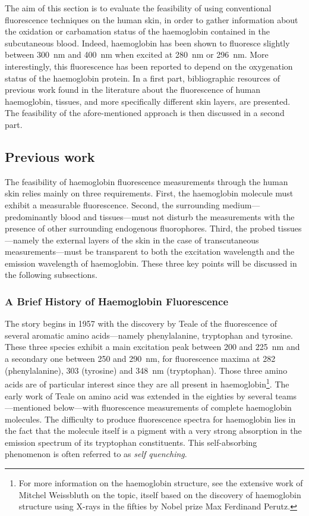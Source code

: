 The aim of this section is to evaluate the feasibility of using conventional fluorescence techniques on the human skin, in order to gather information about the oxidation or carbamation status of the haemoglobin contained in the subcutaneous blood. Indeed, haemoglobin has been shown to fluoresce slightly between 300~nm and 400~nm when excited at 280~nm or 296~nm. More interestingly, this fluorescence has been reported to depend on the oxygenation status of the haemoglobin protein\cite{itoh1981, hirsch2003}. In a first part, bibliographic resources of previous work found in the literature about the fluorescence of human haemoglobin, tissues, and more specifically different skin layers, are presented. The feasibility of the afore-mentioned approach is then discussed in a second part.

\subsection{Previous work}\label{sect:co2hb:fluo:prev_work}

The feasibility of haemoglobin fluorescence measurements through the human skin relies mainly on three requirements. First, the haemoglobin molecule must exhibit a measurable fluorescence. Second, the surrounding medium---predominantly blood and tissues---must not disturb the measurements with the presence of other surrounding endogenous fluorophores. Third, the probed tissues---namely the external layers of the skin in the case of transcutaneous measurements---must be transparent to both the excitation wavelength and the emission wavelength of haemoglobin. These three key points will be discussed in the following subsections.

\subsubsection{A Brief History of Haemoglobin Fluorescence}\label{sect:co2hb:fluo:hb_fluo}

The story begins in 1957 with the discovery by Teale \etal{} of the fluorescence of several aromatic amino acids---namely phenylalanine, tryptophan and tyrosine\cite{teale1957}. These three species exhibit a main excitation peak between 200 and 225~nm and a secondary one between 250 and 290~nm, for fluorescence maxima at 282 (phenylalanine), 303 (tyrosine) and 348~nm (tryptophan). Those three amino acids are of particular interest since they are all present in haemoglobin\footnote{For more information on the haemoglobin structure, see the extensive work of Mitchel Weissbluth on the topic\cite[Table~1.1]{weissbluth1974}, itself based on the discovery of haemoglobin structure using X-rays in the fifties by Nobel prize Max Ferdinand Perutz\cite{perutz1964}.}. The early work of Teale on amino acid was extended in the eighties by several teams---mentioned below---with fluorescence measurements of complete haemoglobin molecules. The difficulty to produce fluorescence spectra for haemoglobin lies in the fact that the molecule itself is a pigment with a very strong absorption in the emission spectrum of its tryptophan constituents. This self-absorbing phenomenon is often referred to as \emph{self quenching}.

